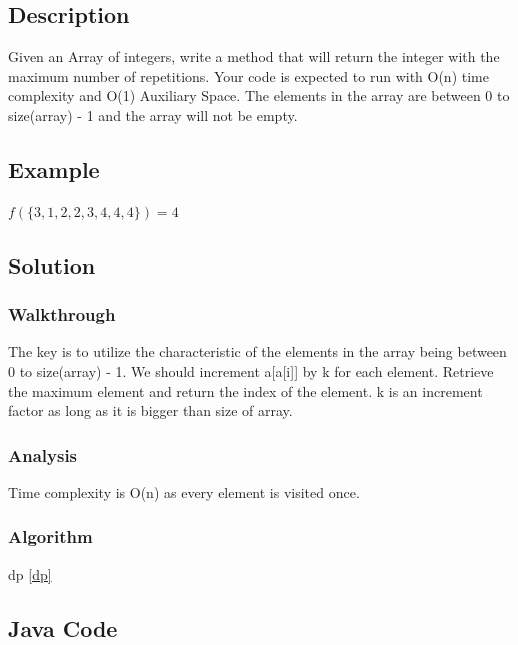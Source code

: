 \documentclass[]{book}
\begin{document}
\hypertarget{description-32}{%
\subsection{Description}\label{description-32}}

Given an Array of integers, write a method that will return the integer with the maximum number of repetitions. Your
code is expected to run with O(n) time complexity and O(1) Auxiliary Space. The elements in the array are between 0 to
size(array) - 1 and the array will not be empty.

\hypertarget{example-31}{%
\subsection{Example}\label{example-31}}

\(f(\{3,1,2,2,3,4,4,4\}) = 4\)

\hypertarget{solution-25}{%
\subsection{Solution}\label{solution-25}}

\hypertarget{walkthrough-31}{%
\subsubsection{Walkthrough}\label{walkthrough-31}}

The key is to utilize the characteristic of the elements in the array being between 0 to size(array) - 1. We should
increment a{[}a{[}i{]}{]} by k for each element. Retrieve the maximum element and return the index of the element. k is an
increment factor as long as it is bigger than size of array.

\hypertarget{analysis-34}{%
\subsubsection{Analysis}\label{analysis-34}}

Time complexity is O(n) as every element is visited once.

\hypertarget{algorithm-34}{%
\subsubsection{Algorithm}\label{algorithm-34}}

dp \ref{dp}

\hypertarget{java-code-28}{%
\subsection{Java Code}\label{java-code-28}}
\end{document}

